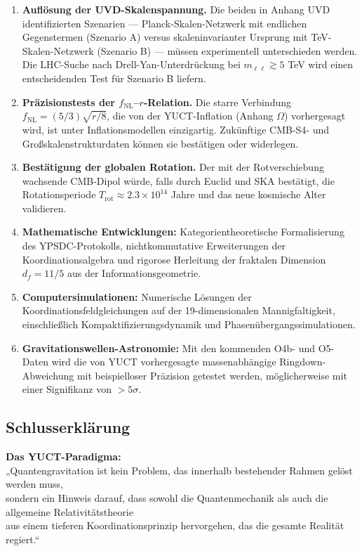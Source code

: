 \documentclass[12pt,a4paper]{article}
\theoremstyle{remark}
\begin{document}
	\begin{enumerate}
		\item \textbf{Auflösung der UVD-Skalenspannung.} Die beiden in Anhang UVD identifizierten Szenarien — Planck-Skalen-Netzwerk mit endlichen Gegenstermen (Szenario A) versus skaleninvarianter Ursprung mit TeV-Skalen-Netzwerk (Szenario B) — müssen experimentell unterschieden werden. Die LHC-Suche nach Drell-Yan-Unterdrückung bei $m_{\ell\ell}\gtrsim5$ TeV wird einen entscheidenden Test für Szenario B liefern.
		
		\item \textbf{Präzisionstests der $f_{\mathrm{NL}}$–$r$-Relation.} Die starre Verbindung $f_{\mathrm{NL}}=(5/3)\sqrt{r/8}$, die von der YUCT-Inflation (Anhang $\Omega$) vorhergesagt wird, ist unter Inflationsmodellen einzigartig. Zukünftige CMB-S4- und Großskalenstrukturdaten können sie bestätigen oder widerlegen.
		
		\item \textbf{Bestätigung der globalen Rotation.} Der mit der Rotverschiebung wachsende CMB-Dipol würde, falls durch Euclid und SKA bestätigt, die Rotationsperiode $T_{\mathrm{rot}}\approx2.3\times10^{14}$ Jahre und das neue kosmische Alter validieren.
		
		\item \textbf{Mathematische Entwicklungen:} Kategorientheoretische Formalisierung des YPSDC-Protokolls, nichtkommutative Erweiterungen der Koordinationsalgebra und rigorose Herleitung der fraktalen Dimension $d_f=11/5$ aus der Informationsgeometrie.
		
		\item \textbf{Computersimulationen:} Numerische Lösungen der Koordinationsfeldgleichungen auf der 19-dimensionalen Mannigfaltigkeit, einschließlich Kompaktifizierungsdynamik und Phasenübergangssimulationen.
		
		\item \textbf{Gravitationswellen-Astronomie:} Mit den kommenden O4b- und O5-Daten wird die von YUCT vorhergesagte massenabhängige Ringdown-Abweichung mit beispielloser Präzision getestet werden, möglicherweise mit einer Signifikanz von $>5\sigma$.
	\end{enumerate}
	
	\subsection{Schlusserklärung}
	
	\begin{center}
		\textbf{Das YUCT-Paradigma:}\\
		„Quantengravitation ist kein Problem, das innerhalb bestehender Rahmen gelöst werden muss,\\
		sondern ein Hinweis darauf, dass sowohl die Quantenmechanik als auch die allgemeine Relativitätstheorie\\
		aus einem tieferen Koordinationsprinzip hervorgehen, das die gesamte Realität regiert.“
	\end{center}
	
\end{document}
